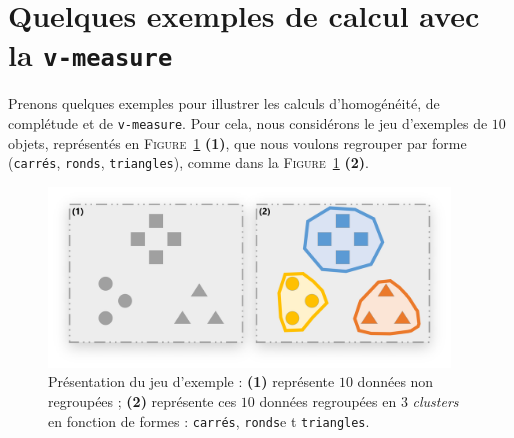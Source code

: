 	\newpage
	\section{Quelques exemples de calcul avec la \texttt{v-measure}}
	\label{annex:D.2-ANNEXE-EVALUATION-CLUSTERING-EXEMPLE-VMEASURE}
		
		Prenons quelques exemples pour illustrer les calculs d'homogénéité, de complétude et de \texttt{v-measure}.
		Pour cela, nous considérons le jeu d'exemples de $10$ objets, représentés en \textsc{Figure~\ref{figure:D.2-ANNEXE-EVALUATION-CLUSTERING-EXEMPLE-VMEASURE-0-PRESENTATION}} \textbf{(1)}, que nous voulons regrouper par forme (\texttt{carrés}, \texttt{ronds}, \texttt{triangles}), comme dans la \textsc{Figure~\ref{figure:D.2-ANNEXE-EVALUATION-CLUSTERING-EXEMPLE-VMEASURE-0-PRESENTATION}} \textbf{(2)}.
		\begin{figure}[H]
			\centering
			\includegraphics[width=0.95\textwidth]{figures/annexe-vmeasure-presentation}
			\caption{
				Présentation du jeu d'exemple :
				\textbf{(1)} représente $10$ données non regroupées ;
				\textbf{(2)} représente ces $10$ données regroupées en $3$ \textit{clusters} en fonction de formes : \texttt{carrés}, \texttt{ronds}e t \texttt{triangles}.
			}
			\label{figure:D.2-ANNEXE-EVALUATION-CLUSTERING-EXEMPLE-VMEASURE-0-PRESENTATION}
		\end{figure}
		
